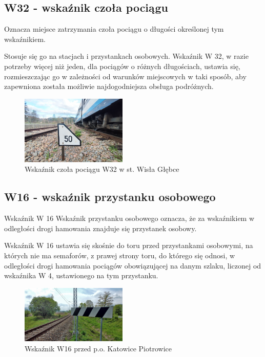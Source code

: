 \subsection{W32 - wskaźnik czoła pociągu}
\begin{tcolorbox}[colback=black!5!white,colframe=white!55!black,title=Wskaźnik W32]
Oznacza miejsce zatrzymania czoła pociągu o długości określonej tym wskaźnikiem.
\end{tcolorbox} Stosuje się go na stacjach i przystankach osobowych. Wskaźnik W 32, w razie potrzeby więcej niż jeden, dla pociągów o różnych długościach, ustawia się, rozmieszczając go w zależności od warunków miejscowych w taki sposób, aby zapewniona została możliwie
najdogodniejsza obsługa podróżnych.
	\begin{figure}
		\includegraphics[width=0.45\textwidth]{skryptkierownik-img/wskaznik-w32.jpg}
		\caption{Wskaźnik czoła pociągu W32 w st. Wisła Głębce}
	\end{figure}

\subsection{W16 - wskaźnik przystanku osobowego}
\begin{tcolorbox}[colback=black!5!white,colframe=white!55!black,title=Wskaźnik W16]
Wskaźnik W 16 {\textquotedbl}Wskaźnik przystanku osobowego{\textquotedbl} oznacza, że za wskaźnikiem w odległości drogi hamowania znajduje się przystanek osobowy.
\end{tcolorbox} Wskaźnik W 16 ustawia się skośnie do toru przed przystankami osobowymi, na których nie ma semaforów, z prawej strony toru, do którego się odnosi, w odległości drogi hamowania pociągów obowiązującej na danym szlaku, liczonej od wskaźnika W 4, ustawionego na tym przystanku.
	\begin{figure}
		\includegraphics[width=0.45\textwidth]{skryptkierownik-img/wskaznik-w16.jpg}
		\caption{Wskaźnik W16 przed p.o. Katowice Piotrowice}
	\end{figure}

